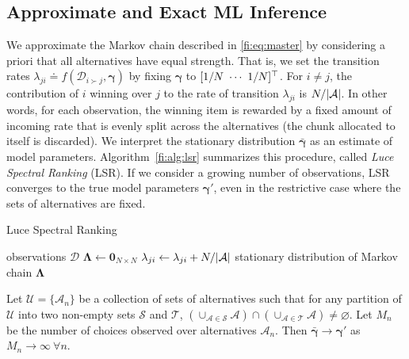 \subsection{Approximate and Exact ML Inference}

We approximate the Markov chain described in \eqref{fi:eq:master} by considering a priori that all alternatives have equal strength.
That is, we set the transition rates $\lambda_{ji} \doteq f(\mathcal{D}_{i \succ j}, \bm{\gamma})$ by fixing $\bm{\gamma}$ to $[1/N \  \cdots \  1/N]^\top$.
For $i \ne j$, the contribution of $i$ winning over $j$ to the rate of transition $\lambda_{ji}$ is $N / \lvert\mathcal{A}\rvert$.
In other words, for each observation, the winning item is rewarded by a fixed amount of incoming rate that is evenly split across the alternatives (the chunk allocated to itself is discarded).
We interpret the stationary distribution $\bar{\bm{\gamma}}$ as an estimate of model parameters.
Algorithm~\ref{fi:alg:lsr} summarizes this procedure, called \emph{Luce Spectral Ranking} (LSR).
If we consider a growing number of observations, LSR converges to the true model parameters $\bm{\gamma}'$, even in the restrictive case where the sets of alternatives are fixed.

\begin{algorithm}[t]
  \caption{Luce Spectral Ranking}
  \label{fi:alg:lsr}
  \begin{algorithmic}[1]
    \Require observations $\mathcal{D}$
    \State $\bm{\Lambda} \gets \bm{0}_{N \times N}$
        \State $\lambda_{ji} \gets \lambda_{ji} + N / \lvert\mathcal{A}\rvert$
      \EndFor
    \EndFor
    \State \Return stationary distribution of Markov chain $\bm{\Lambda}$
  \end{algorithmic}
\end{algorithm}

\begin{theorem}
\label{fi:thm:consistency}
Let $\mathcal{U} = \{ \mathcal{A}_n \}$ be a collection of sets of alternatives such that for any partition of $\mathcal{U}$ into two non-empty sets $\mathcal{S}$ and $\mathcal{T}$, $\left( \cup_{\mathcal{A} \in \mathcal{S}} \mathcal{A} \right) \cap \left( \cup_{\mathcal{A} \in \mathcal{T}} \mathcal{A} \right) \ne \varnothing$.
Let $M_n$ be the number of choices observed over alternatives $\mathcal{A}_n$.
Then $\bar{\bm{\gamma}} \to \bm{\gamma}'$ as $M_n \to \infty \ \forall n$.
\end{theorem}

